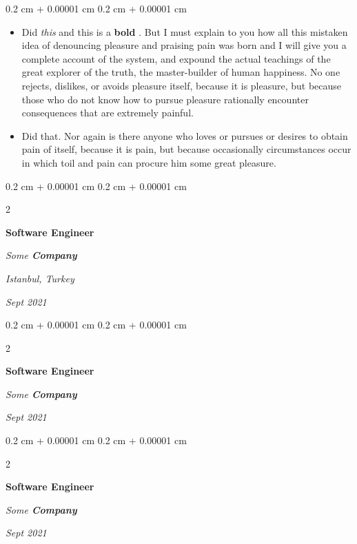 \documentclass[10pt, letterpaper]{article}
\newenvironment{highlights}{
    \begin{itemize}[
        topsep=0.10 cm,
        parsep=0.10 cm,
        partopsep=0pt,
        itemsep=0pt,
        leftmargin=0.4 cm + 10pt
    ]
}{
    \end{itemize}
} %
\newenvironment{onecolentry}{
    \begin{adjustwidth}{
        0.2 cm + 0.00001 cm
    }{
        0.2 cm + 0.00001 cm
    }
}{
    \end{adjustwidth}
} %
\newenvironment{twocolentry}[2][]{
    \onecolentry
    \def\secondColumn{#2}
    \setcolumnwidth{\fill, 4.5 cm}
    \begin{paracol}{2}
}{
    \switchcolumn \raggedleft \secondColumn
    \end{paracol}
    \endonecolentry
} %
\let\hrefWithoutArrow\href
\renewcommand{\href}[2]{\hrefWithoutArrow{#1}{\ifthenelse{\equal{#2}{}}{ }{#2 }\raisebox{.15ex}{\footnotesize \faExternalLink*}}}
\begin{document}
        \vspace{0.10 cm}
        \begin{onecolentry}
            \begin{highlights}
                \item Did \textit{this} and this is a \textbf{bold} \href{https://example.com}{link}. But I must explain to you how all this mistaken idea of denouncing pleasure and praising pain was born and I will give you a complete account of the system, and expound the actual teachings of the great explorer of the truth, the master-builder of human happiness. No one rejects, dislikes, or avoids pleasure itself, because it is pleasure, but because those who do not know how to pursue pleasure rationally encounter consequences that are extremely painful.
                \item Did that. Nor again is there anyone who loves or pursues or desires to obtain pain of itself, because it is pain, but because occasionally circumstances occur in which toil and pain can procure him some great pleasure.
            \end{highlights}
        \end{onecolentry}


        \vspace{0.2 cm}

        \begin{twocolentry}{
        \textit{Istanbul, Turkey}    
            
        \textit{Sept 2021}}
            \textbf{Software Engineer}
            
            \textit{Some \textbf{Company}}
        \end{twocolentry}



        \vspace{0.2 cm}

        \begin{twocolentry}{
            
            
        \textit{Sept 2021}}
            \textbf{Software Engineer}
            
            \textit{Some \textbf{Company}}
        \end{twocolentry}



        \vspace{0.2 cm}

        \begin{twocolentry}{
            
            
        \textit{Sept 2021}}
            \textbf{Software Engineer}
            
            \textit{Some \textbf{Company}}
        \end{twocolentry}
\end{document}
